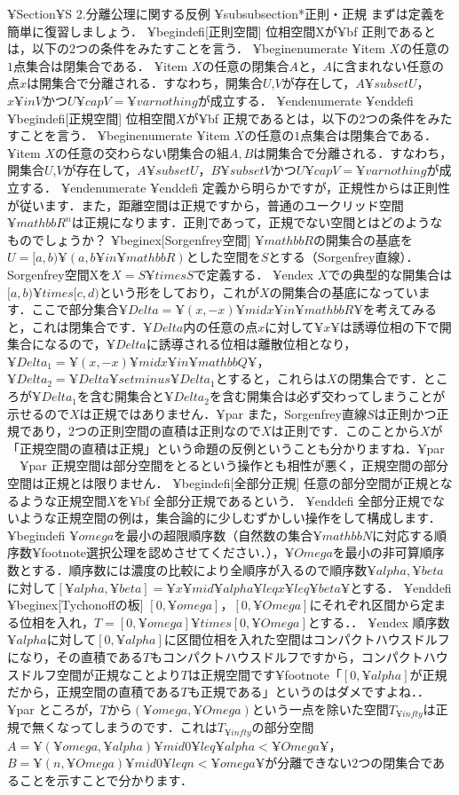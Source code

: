 ¥Section{¥S 2.分離公理に関する反例}
¥subsubsection*{正則・正規}
まずは定義を簡単に復習しましょう．
¥begin{defi}[正則空間]
位相空間Xが{¥bf 正則}であるとは，以下の2つの条件をみたすことを言う．
¥begin{enumerate}
¥item $X$の任意の$1$点集合は閉集合である．
¥item $X$の任意の閉集合$A$と，$A$に含まれない任意の点$x$は開集合で分離される．すなわち，開集合$U$,$V$が存在して，$A¥subset U$，$x¥in V$かつ$U¥cap V=¥varnothing$が成立する．
¥end{enumerate}
¥end{defi}
¥begin{defi}[正規空間]
位相空間$X$が{¥bf 正規}であるとは，以下の2つの条件をみたすことを言う．
¥begin{enumerate}
¥item $X$の任意の$1$点集合は閉集合である．
¥item $X$の任意の交わらない閉集合の組$A,B$は開集合で分離される．すなわち，開集合$U$,$V$が存在して，$A¥subset U$，$B¥subset V$かつ$U¥cap V=¥varnothing$が成立する．
¥end{enumerate}
¥end{defi}
定義から明らかですが，正規性からは正則性が従います．また，距離空間は正規ですから，普通のユークリッド空間$¥mathbb{R}^n$は正規になります．正則であって，正規でない空間とはどのようなものでしょうか？
¥begin{ex}[Sorgenfrey空間]
$¥mathbb{R}$の開集合の基底を$U=[a,b)¥ (a,b¥in¥mathbb{R})$とした空間を$S$とする（Sorgenfrey直線）．Sorgenfrey空間Xを$X=S¥times S$で定義する．
¥end{ex}
$X$での典型的な開集合は$[a,b)¥times[c,d)$という形をしており，これが$X$の開集合の基底になっています．ここで部分集合$¥Delta=¥{(x,-x)¥mid x¥in¥mathbb{R}¥}$を考えてみると，これは閉集合です．$¥Delta$内の任意の点$x$に対して$¥{ x ¥}$は誘導位相の下で開集合になるので，$¥Delta$に誘導される位相は離散位相となり，$¥Delta_1=¥{(x,-x)¥mid x¥in¥mathbb{Q}¥}$，$¥Delta_2=¥Delta¥setminus¥Delta_1$とすると，これらは$X$の閉集合です．ところが$¥Delta_1$を含む開集合と$¥Delta_2$を含む開集合は必ず交わってしまうことが示せるので$X$は正規ではありません．¥par
また，Sorgenfrey直線$S$は正則かつ正規であり，$2$つの正則空間の直積は正則なので$X$は正則です．このことから$X$が「正規空間の直積は正規」という命題の反例ということも分かりますね．¥par
　¥par
正規空間は部分空間をとるという操作とも相性が悪く，正規空間の部分空間は正規とは限りません．
¥begin{defi}[全部分正規]
任意の部分空間が正規となるような正規空間$X$を{¥bf 全部分正規}であるという．
¥end{defi}
全部分正規でないような正規空間の例は，集合論的に少しむずかしい操作をして構成します．
¥begin{defi}
$¥omega$を最小の超限順序数（自然数の集合$¥mathbb{N}$に対応する順序数¥footnote{選択公理を認めさせてください．}），$¥Omega$を最小の非可算順序数とする．順序数には濃度の比較により全順序が入るので順序数$¥alpha,¥beta$に対して$[¥alpha,¥beta]=¥{x¥mid ¥alpha¥leq x¥leq ¥beta¥}$とする．
¥end{defi}
¥begin{ex}[Tychonoffの板]
$[0,¥omega]$，$[0,¥Omega]$にそれぞれ区間から定まる位相を入れ，$T=[0,¥omega]¥times[0,¥Omega]$とする．．
¥end{ex}
順序数$¥alpha$に対して$[0,¥alpha]$に区間位相を入れた空間はコンパクトハウスドルフになり，その直積である$T$もコンパクトハウスドルフですから，コンパクトハウスドルフ空間が正規なことより$T$は正規空間です¥footnote{「$[0,¥alpha]$が正規だから，正規空間の直積である$T$も正規である」というのはダメですよね．}．¥par
ところが，$T$から$(¥omega,¥Omega)$という一点を除いた空間$T_{¥infty}$は正規で無くなってしまうのです．これは$T_{¥infty}$の部分空間$A=¥{(¥omega,¥alpha)¥mid 0¥leq ¥alpha<¥Omega¥}$，$B=¥{ (n,¥Omega)¥mid 0¥leq n<¥omega ¥}$が分離できない$2$つの閉集合であることを示すことで分かります．

